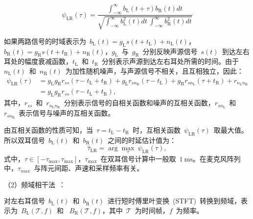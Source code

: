 \begin{equation}\label{eq.IACC_ITD_1}
\psi_{\text{LR}}(\tau) = \frac{\int_{-\infty}^{\infty} b_{\text{L}}(t+\tau)b_{\text{R}}(t)dt}{\sqrt{\int_{-\infty}^{\infty} b_{\text{L}}^{2}(t)dt ~ \int_{-\infty}^{\infty} b_{\text{R}}^{2}(t)dt}}
\end{equation}

如果两路信号的时域表示为~$b_{{\text{L}}}(t)=g _{{\text{L}}} s(t+t_{{\text{L}}})+n_{{\text{L}}}(t)$，$b_{{\text{R}}}(t)=g _{{\text{R}}} s(t+t_{{\text{R}}})+n_{\text{R}}(t)$，$g _{{\text{L}}}$~与~$g _{{\text{R}}}$~分别反映声源信号~$s(t)$~到达左右耳处的幅度衰减函数，$t_{\text{L}}$~和~$t_{\text{R}}$~分别表示声源到达左右耳处所需的时间。由于~$n_{{\text{L}}}(t)$~和~$n_{{\text{R}}}(t)$~为加性随机噪声，与声源信号不相关，且互相独立，因此：
\begin{align}
     \psi_{{\text{L}}{\text{R}} }(\tau)&=g_{\text{L}} g_{\text{R}}r_{ss}(\tau-t_{\text{L}}+t_{\text{R}})+g _{\text{L}}r_{sn_{\text{R}}}(\tau-t_{\text{L}})+g_{\text{R}}r_{sn_{\text{L}}}(\tau+t_{\text{R}})+r_{ n_{\text{L}}n_{\text{R}}}  \nonumber \\
     &=g_{\text{L}} g_{\text{R}} r_{ss}(\tau-t_{\text{L}}+t_{\text{R}}),
\end{align}
其中，$r_{ss}$~和~$r_{ n_{\text{L}}n_{\text{R}}}$~分别表示信号的自相关函数和噪声的互相关函数，$r_{sn_{\text{L}}}$~和~$r_{sn_{\text{R}}}$~表示信号与噪声的互相关函数。

由互相关函数的性质可知，当~$\tau=t_{{\text{L}}}-t_{{\text{R}}}$~时，互相关函数~$\psi_{{\text{L}}{\text{R}}}(\tau)$~取最大值。所以双耳信号~$b_{\text{L}}(t)$~和~$b_{\text{R}}(t)$~之间的时延估计值为：
\begin{equation}
     \hat{\tau}_{\text{L}\text{R}}=\arg \max \limits_{\tau}~\psi_{\text{L}\text{R}}(\tau),
\end{equation}
式中，$\tau\in[-\tau _\text{max},\tau _\text{max}]$，$\tau _\text{max}$~在双耳信号计算中一般取~$1~\mathrm{ms}$。在麦克风阵列中，$\tau_{max}$~与阵元间距、声速和采样频率有关。

（2）频域相干法~：

对左右耳信号~$b_{\text{L}}(t)$~和~$b_{\text{R}}(t)$~进行短时傅里叶变换~(STFT)~转换到频域，表示为~$B_{\text{L}}(\mathscr{T},f)$~和~
$B_{\text{R}}(\mathscr{T},f)$，其中~$\mathscr{T}$~为时间帧，$f$~为频率。

